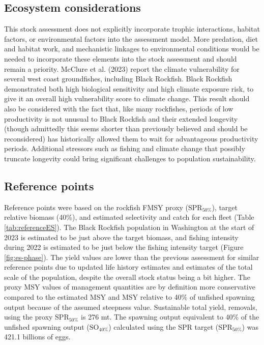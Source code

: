 \documentclass[11pt,
  letterpaper,
]{article}
\begin{document}
\hypertarget{ecosystem-considerations}{%
\subsection*{Ecosystem considerations}\label{ecosystem-considerations}}

This stock assessment does not explicitly incorporate trophic interactions, habitat factors, or environmental factors into the assessment model. More predation, diet and habitat work, and mechanistic linkages to environmental conditions would be needed to incorporate these elements into the stock assessment and should remain a priority. McClure et al. (2023) report the climate vulnerability for several west coast groundfishes, including Black Rockfish. Black Rockfish demonstrated both high biological sensitivity and high climate exposure risk, to give it an overall high vulnerability score to climate change. This result should also be considered with the fact that, like many rockfishes, periods of low productivity is not unusual to Black Rockfish and their extended longevity (though admittedly this seems shorter than previously believed and should be reconsidered) has historically allowed them to wait for advantageous productivity periods. Additional stressors such as fishing and climate change that possibly truncate longevity could bring significant challenges to population sustainability.

\hypertarget{reference-points}{%
\subsection*{Reference points}\label{reference-points}}

Reference points were based on the rockfish FMSY proxy (\(\text{SPR}_{50\%}\)), target relative biomass (40\%), and estimated selectivity and catch for each fleet (Table \ref{tab:referenceES}). The Black Rockfish population in Washington at the start of 2023 is estimated to be just above the target biomass, and fishing intensity during 2022 is estimated to be just below the fishing intensity target (Figure \ref{fig:es-phase}). The yield values are lower than the previous assessment for similar reference points due to updated life history estimates and estimates of the total scale of the population, despite the overall stock status being a bit higher. The proxy MSY values of management quantities are by definition more conservative compared to the estimated MSY and MSY relative to 40\% of unfished spawning output because of the assumed steepness value. Sustainable total yield, removals, using the proxy \(\text{SPR}_{50\%}\) is 276 mt. The spawning output equivalent to 40\% of the unfished spawning output (\(\text{SO}_{40\%}\)) calculated using the SPR target (\(\text{SPR}_{50\%}\)) was 421.1 billions of eggs.
\end{document}
